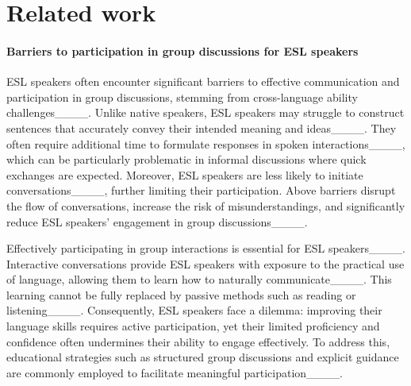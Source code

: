 \section{Related work}
\label{sec:related-work}


\paragraph{Barriers to participation in group discussions for ESL speakers}  


ESL speakers often encounter significant barriers to effective communication and participation in group discussions, stemming from cross-language ability challenges____. Unlike native speakers, ESL speakers may struggle to construct sentences that accurately convey their intended meaning and ideas____. They often require additional time to formulate responses in spoken interactions____, which can be particularly problematic in informal discussions where quick exchanges are expected. Moreover, ESL speakers are less likely to initiate conversations____, further limiting their participation. Above barriers disrupt the flow of conversations, increase the risk of misunderstandings, and significantly reduce ESL speakers' engagement in group discussions____.


Effectively participating in group interactions is essential for ESL speakers____. Interactive conversations provide ESL speakers with exposure to the practical use of language, allowing them to learn how to naturally communicate____. This learning cannot be fully replaced by passive methods such as reading or listening____. Consequently, ESL speakers face a dilemma: improving their language skills requires active participation, yet their limited proficiency and confidence often undermines their ability to engage effectively. To address this, educational strategies such as structured group discussions and explicit guidance are commonly employed to facilitate meaningful participation____.

